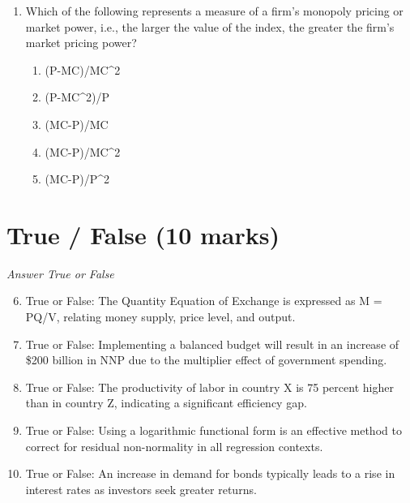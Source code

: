 \documentclass[12pt]{article}
\begin{document}
\begin{enumerate}[label=\arabic*.]
\begin{enumerate}[label=(\alph*)]
    \item Quantity supplied of pears falls.
    \item The price of apples falls.
    \item There is no change in the quantity demanded or supplied.
    \item The price of pears falls.
    \item Quantity demanded of pears falls.
\end{enumerate}
\item Which of the following represents a measure of a firm's monopoly pricing or market power,
i.e., the larger the value of the index, the greater the firm's market pricing power?
\begin{enumerate}[label=(\alph*)]
    \item (P-MC)/MC\^{}2
    \item (P-MC\^{}2)/P
    \item (MC-P)/MC
    \item (MC-P)/MC\^{}2
    \item (MC-P)/P\^{}2
\end{enumerate}
\end{enumerate}

\section*{True / False (10 marks)}
\textit{Answer True or False}
\begin{enumerate}[label=\arabic*.]
\setcounter{enumi}{5}
\item True or False: The Quantity Equation of Exchange is expressed as M = PQ/V, relating money supply, price level, and output.
\item True or False: Implementing a balanced budget will result in an increase of \$200 billion in NNP due to the multiplier effect of government spending.
\item True or False: The productivity of labor in country X is 75 percent higher than in country Z, indicating a significant efficiency gap.
\item True or False: Using a logarithmic functional form is an effective method to correct for residual non-normality in all regression contexts.
\item True or False: An increase in demand for bonds typically leads to a rise in interest rates as investors seek greater returns.
\end{enumerate}
\end{document}

